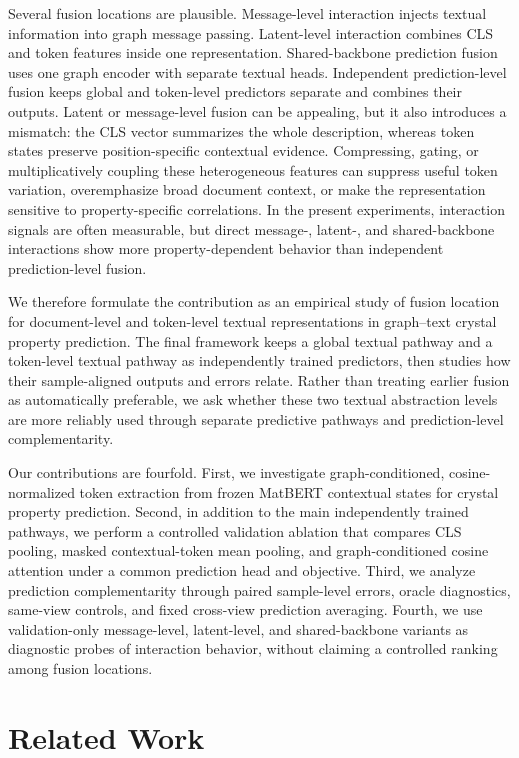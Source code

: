 \documentclass[a4paper,fleqn]{cas-sc}
\begin{document}
Several fusion locations are plausible. Message-level interaction injects textual information into graph message passing. Latent-level interaction combines CLS and token features inside one representation. Shared-backbone prediction fusion uses one graph encoder with separate textual heads. Independent prediction-level fusion keeps global and token-level predictors separate and combines their outputs. Latent or message-level fusion can be appealing, but it also introduces a mismatch: the CLS vector summarizes the whole description, whereas token states preserve position-specific contextual evidence. Compressing, gating, or multiplicatively coupling these heterogeneous features can suppress useful token variation, overemphasize broad document context, or make the representation sensitive to property-specific correlations. In the present experiments, interaction signals are often measurable, but direct message-, latent-, and shared-backbone interactions show more property-dependent behavior than independent prediction-level fusion.

We therefore formulate the contribution as an empirical study of fusion location for document-level and token-level textual representations in graph--text crystal property prediction. The final framework keeps a global textual pathway and a token-level textual pathway as independently trained predictors, then studies how their sample-aligned outputs and errors relate. Rather than treating earlier fusion as automatically preferable, we ask whether these two textual abstraction levels are more reliably used through separate predictive pathways and prediction-level complementarity.

Our contributions are fourfold. First, we investigate graph-conditioned, cosine-normalized token extraction from frozen MatBERT contextual states for crystal property prediction. Second, in addition to the main independently trained pathways, we perform a controlled validation ablation that compares CLS pooling, masked contextual-token mean pooling, and graph-conditioned cosine attention under a common prediction head and objective. Third, we analyze prediction complementarity through paired sample-level errors, oracle diagnostics, same-view controls, and fixed cross-view prediction averaging. Fourth, we use validation-only message-level, latent-level, and shared-backbone variants as diagnostic probes of interaction behavior, without claiming a controlled ranking among fusion locations.

\section{Related Work}
\end{document}
